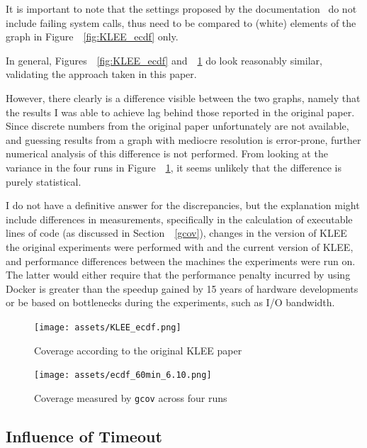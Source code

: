 \documentclass{article}
\let\savedCite=\cite
\renewcommand{\cite}{\unskip~\savedCite}
\let\savedRef=\ref
\renewcommand{\ref}{\unskip~\savedRef}
\begin{document}
It is important to note that the settings proposed by the documentation\cite{KLEEFAQ} do not include failing system calls, thus need to be compared to  (white) elements of the graph in Figure~\ref{fig:KLEE_ecdf} only.

In general, Figures~\ref{fig:KLEE_ecdf} and~\ref{fig:ecdf_60min_6.10} do look reasonably similar, validating the approach taken in this paper.

However, there clearly is a difference visible between the two graphs, namely that the results I was able to achieve lag behind those reported in the original paper. Since discrete numbers from the original paper unfortunately are not available, and guessing results from a graph with mediocre resolution is error-prone, further numerical analysis of this difference is not performed. From looking at the variance in the four runs in Figure~\ref{fig:ecdf_60min_6.10}, it seems unlikely that the difference is purely statistical.

I do not have a definitive answer for the discrepancies, but the explanation might include differences in measurements, specifically in the calculation of executable lines of code (as discussed in Section~\ref{gcov}), changes in the version of KLEE the original experiments were performed with and the current version of KLEE, and performance differences between the machines the experiments were run on. The latter would either require that the performance penalty incurred by using Docker is greater than the speedup gained by 15 years of hardware developments or be based on bottlenecks during the experiments, such as I/O bandwidth.

\begin{figure}[htbp]
    \centering
    \begin{minipage}[b]{0.48\linewidth}
        \texttt{[image: assets/KLEE\_ecdf.png]}
        \captionsetup{width=0.7\linewidth, skip=24px}
        \caption{Coverage according to the original KLEE paper\cite{KLEE}}
        \label{fig:KLEE_ecdf}
    \end{minipage}
    \hfill
    \begin{minipage}[b]{0.48\linewidth}
        \texttt{[image: assets/ecdf\_60min\_6.10.png]}
        \captionsetup{width=0.75\linewidth}
        \caption{Coverage measured by \lstinline{gcov} across four runs}
        \label{fig:ecdf_60min_6.10}
    \end{minipage}
\end{figure}

\subsection{Influence of Timeout}
\end{document}
